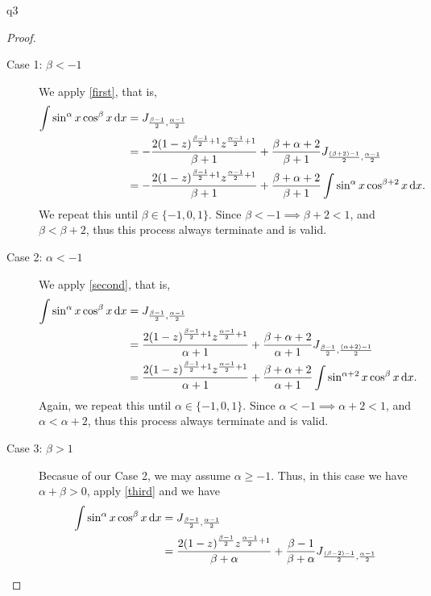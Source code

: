 \documentclass[reqno]{alittlebear}
\begin{document}
\begin{exercise}{}{}
\begin{question}{}{q3}
\begin{proof}
            \begin{description}
                \item[Case 1: $\beta<-1$] We apply \eqref{first}, that is, \begin{align*}
                    \int\sin^\alpha x\cos^\beta x\mathop{}\!\mathrm{d} x&= J_{\frac{\beta-1}{2},\frac{\alpha-1}{2}}\\
                    &=-\frac{2(1-z)^{\frac{\beta-1}{2}+1}z^{\frac{\alpha-1}{2}+1}}{\beta+1}+\frac{\beta+\alpha+2}{\beta+1}J_{\frac{(\beta+2)-1}{2},\frac{\alpha-1}{2}}\\
                    &=-\frac{2(1-z)^{\frac{\beta-1}{2}+1}z^{\frac{\alpha-1}{2}+1}}{\beta+1}+\frac{\beta+\alpha+2}{\beta+1}\int\sin^\alpha x\cos^{\beta+2} x\mathop{}\!\mathrm{d} x.\\
                \end{align*}
                We repeat this until $\beta\in\{-1,0,1\}$. Since $\beta<-1\implies\beta+2<1$, and $\beta<\beta+2$, thus this process always terminate and is valid.
                \item[Case 2: $\alpha<-1$]  We apply \eqref{second}, that is, \begin{align*}
                    \int\sin^\alpha x\cos^\beta x\mathop{}\!\mathrm{d} x &= J_{\frac{\beta-1}{2},\frac{\alpha-1}{2}}\\
                    &=\frac{2(1-z)^{\frac{\beta-1}{2}+1}z^{\frac{\alpha-1}{2}+1}}{\alpha+1}+\frac{\beta+\alpha+2}{\alpha+1}J_{\frac{\beta-1}{2},\frac{(\alpha+2)-1}{2}}\\
                    &=\frac{2(1-z)^{\frac{\beta-1}{2}+1}z^{\frac{\alpha-1}{2}+1}}{\alpha+1}+\frac{\beta+\alpha+2}{\alpha+1}\int\sin^{\alpha+2} x\cos^{\beta} x\mathop{}\!\mathrm{d} x.\\
                \end{align*}
                Again, we repeat this until $\alpha\in\{-1,0,1\}$. Since $\alpha<-1\implies\alpha+2<1$, and $\alpha<\alpha+2$, thus this process always terminate and is valid.
                \item[Case 3: $\beta>1$] Becasue of our Case 2, we may assume $\alpha\geq-1$. Thus, in this case we have $\alpha+\beta>0$, apply \eqref{third} and we have \begin{align*}
                    \int\sin^\alpha x\cos^\beta x\D x &= J_{\frac{\beta-1}{2},\frac{\alpha-1}{2}}\\
                    &=\frac{2(1-z)^{\frac{\beta-1}{2}}z^{\frac{\alpha-1}{2}+1}}{\beta+\alpha}+\frac{\beta-1}{\beta+\alpha}J_{\frac{(\beta-2)-1}{2},\frac{\alpha-1}{2}}\\

\end{align*}
\end{description}
\end{proof}
\end{question}
\end{exercise}
\end{document}
